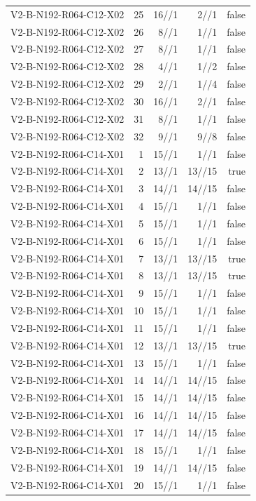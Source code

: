 {\begin{longtable}{lrrrr}
V2-B-N192-R064-C12-X02 & 25 & 16//1 & 2//1 & false \\
V2-B-N192-R064-C12-X02 & 26 & 8//1 & 1//1 & false \\
V2-B-N192-R064-C12-X02 & 27 & 8//1 & 1//1 & false \\
V2-B-N192-R064-C12-X02 & 28 & 4//1 & 1//2 & false \\
V2-B-N192-R064-C12-X02 & 29 & 2//1 & 1//4 & false \\
V2-B-N192-R064-C12-X02 & 30 & 16//1 & 2//1 & false \\
V2-B-N192-R064-C12-X02 & 31 & 8//1 & 1//1 & false \\
V2-B-N192-R064-C12-X02 & 32 & 9//1 & 9//8 & false \\
V2-B-N192-R064-C14-X01 & 1 & 15//1 & 1//1 & false \\
V2-B-N192-R064-C14-X01 & 2 & 13//1 & 13//15 & true \\
V2-B-N192-R064-C14-X01 & 3 & 14//1 & 14//15 & false \\
V2-B-N192-R064-C14-X01 & 4 & 15//1 & 1//1 & false \\
V2-B-N192-R064-C14-X01 & 5 & 15//1 & 1//1 & false \\
V2-B-N192-R064-C14-X01 & 6 & 15//1 & 1//1 & false \\
V2-B-N192-R064-C14-X01 & 7 & 13//1 & 13//15 & true \\
V2-B-N192-R064-C14-X01 & 8 & 13//1 & 13//15 & true \\
V2-B-N192-R064-C14-X01 & 9 & 15//1 & 1//1 & false \\
V2-B-N192-R064-C14-X01 & 10 & 15//1 & 1//1 & false \\
V2-B-N192-R064-C14-X01 & 11 & 15//1 & 1//1 & false \\
V2-B-N192-R064-C14-X01 & 12 & 13//1 & 13//15 & true \\
V2-B-N192-R064-C14-X01 & 13 & 15//1 & 1//1 & false \\
V2-B-N192-R064-C14-X01 & 14 & 14//1 & 14//15 & false \\
V2-B-N192-R064-C14-X01 & 15 & 14//1 & 14//15 & false \\
V2-B-N192-R064-C14-X01 & 16 & 14//1 & 14//15 & false \\
V2-B-N192-R064-C14-X01 & 17 & 14//1 & 14//15 & false \\
V2-B-N192-R064-C14-X01 & 18 & 15//1 & 1//1 & false \\
V2-B-N192-R064-C14-X01 & 19 & 14//1 & 14//15 & false \\
V2-B-N192-R064-C14-X01 & 20 & 15//1 & 1//1 & false \\

\end{longtable}}
